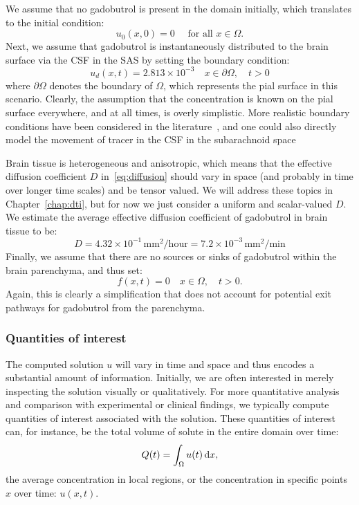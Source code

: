 We assume that no gadobutrol is present in the domain initially,
which translates to the initial condition:
\begin{equation}
  \label{eq:chp3:ic}
  u_0(x, 0) = 0 \quad \text{ for all } x \in \Omega.
\end{equation}
Next, we assume that gadobutrol is instantaneously distributed to the brain 
surface via the CSF in the SAS by setting the
boundary condition:
\begin{equation}
  \label{eq:chp3:bc}
  u_d(x, t) = 2.813 \times 10^{-3} \quad x \in \partial \Omega, \quad t > 0
\end{equation}
where $\partial \Omega$ denotes the boundary of $\Omega$, which
represents the pial surface in this scenario. Clearly, the assumption
that the concentration is known on the pial surface everywhere, and at
all times, is overly simplistic. More realistic boundary conditions
have been considered in the
literature~\cite{croci2019uncertainty,valnes2020apparent}, and one
could also directly model the movement of tracer in the CSF in the
subarachnoid space~\cite{haga2017numerical,pizzichelli2017numerical}

Brain tissue is heterogeneous and anisotropic, which means that the
effective diffusion coefficient $D$ in~\eqref{eq:diffusion} should
vary in space (and probably in time over longer time scales) and be
tensor valued. We will address these topics in Chapter~\ref{chap:dti},
but for now we just consider a uniform and scalar-valued $D$. We
estimate the average effective diffusion coefficient of gadobutrol in
brain tissue to be:
\begin{equation}
  D  
  = 4.32 \times 10^{-1} \, \text{mm$^2$/hour}
  = 7.2 \times 10^{-3} \, \text{mm$^2$/min}
\end{equation}
Finally, we assume that there are no sources or sinks of gadobutrol
within the brain parenchyma, and thus set:
\begin{equation}
  f(x, t) = 0 \quad x \in \Omega, \quad t > 0.
\end{equation}
Again, this is clearly a simplification that does not account for
potential exit pathways for gadobutrol from the parenchyma.

\subsubsection{Quantities of interest}
The computed solution $u$ will vary in time and space and thus encodes
a substantial amount of information. Initially, we are often
interested in merely inspecting the solution visually or
qualitatively. For more quantitative analysis and comparison with
experimental or clinical findings, we typically compute quantities of
interest associated with the solution. These quantities of interest
can, for instance, be the total volume of solute in the entire domain
over time:
\begin{equation}
  \label{eq:chp3:qoi}
  Q(t) = \int_{\Omega} u (t) \, \mathrm{d}x, 
\end{equation}
the average concentration in local regions, or the concentration in
specific points $x$ over time: $u(x, t)$.

